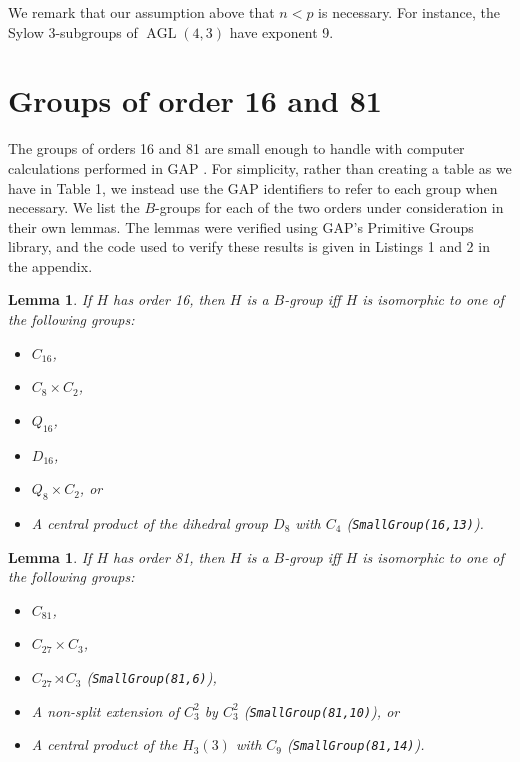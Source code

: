 \documentclass[12pt]{amsart}
\newtheorem{lemma}[theorem]{Lemma}
\theoremstyle{definition}
\DeclareMathOperator{\AGL}{AGL}
\begin{document}
We remark that our assumption above that $n < p$ is necessary. For instance, the Sylow 3-subgroups of $\AGL(4,3)$ have exponent 9.


\section{Groups of order 16 and 81}
	
The groups of orders 16 and 81 are small enough to handle with computer calculations performed in GAP \cite{Gap}. For simplicity, rather than creating a table as we have in Table 1, we instead use the GAP identifiers to refer to each group when necessary. We list the $B$-groups for each of the two orders under consideration in their own lemmas. The lemmas were verified using GAP's Primitive Groups library, and the code used to verify these results is given in Listings 1 and 2 in the appendix.
	
\begin{lemma}\label{order16}
	If $H$ has order 16, then $H$ is a $B$-group iff $H$ is isomorphic to one of the following groups:
	\begin{itemize}
		\item[(i)] $C_{16}$,
		\item[(ii)] $C_{8} \times C_2$,
		\item[(iii)] $Q_{16}$,
		\item[(iv)] $D_{16}$,
		\item[(v)] $Q_8 \times C_2$, or
		\item[(vi)] A central product of the dihedral group $D_8$ with $C_4$ (\texttt{SmallGroup(16,13)}).
	\end{itemize} 
\end{lemma}

\begin{lemma}\label{order81}
If $H$ has order 81, then $H$ is a $B$-group iff $H$ is isomorphic to one of the following groups:
\begin{itemize}
	\item[(i)] $C_{81}$,
	\item[(ii)] $C_{27} \times C_3$,
	\item[(iii)] $C_{27} \rtimes C_3$ (\texttt{SmallGroup(81,6)}),
	\item[(iv)] A non-split extension of $C_3^2$ by $C_3^2$ (\texttt{SmallGroup(81,10)}), or
	\item[(v)] A central product of the $H_3(3)$ with $C_9$ (\texttt{SmallGroup(81,14)}).
\end{itemize} 
\end{lemma}
\end{document}
